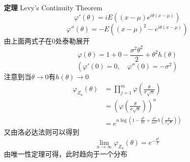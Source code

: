 \documentclass{article}
\begin{document}
\begin{CJK*}{UTF8}{gbsn}
\textbf{定理} Levy's Continuity Theorem
\[
\varphi'(\theta) = iE((x-\mu)e^{i\theta(x-\mu)})
\]
\[
\varphi''(\theta) = -E((x-\mu)^2-e^{i\theta(x-\mu)})
\]
由上面两式子在0处泰勒展开
\[
\varphi(\theta) = 1+0-\frac{\sigma^2 \theta^2}{2} + \theta^2 h(\theta)
\]
\[
(\varphi'(0) = 0, \quad \varphi''(0)=-\sigma^2)
\]
注意到当$\theta \to 0$有$h(\theta)\to 0$
\[
\begin{split}
\varphi_{Z_n}(\theta) 
	&= \prod^m_{j=1}\varphi(\frac{\theta}{\sigma \sqrt{n}}) \\
	&= (\varphi(\frac{\theta}{\sigma \sqrt{n}}))^n \\
	&= e^{n\log(1-\frac{\theta^2}{2n} +\frac{\theta^2}{n\sigma^2}h(\frac{\theta}{\sigma \sqrt{n}}))}
\end{split}
\]
又由洛必达法则可以得到
\[
\lim_{n\to \infty}\varphi_{Z_n}(\theta) = e^{-\frac{\theta^2}{2}}
\]
由唯一性定理可得，此时趋向于一个分布
\end{CJK*}
\end{document}

